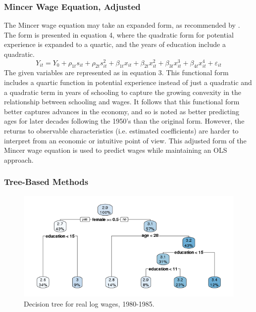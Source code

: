 \documentclass[notitlepage,12pt]{article}
\begin{document}
\subsubsection{Mincer Wage Equation, Adjusted}
The Mincer wage equation may take an expanded form, as recommended by \cite{lemieux2006mincer}.  The form is presented in equation 4, where the quadratic form for potential experience is expanded to a quartic, and the years of education include a quadratic.  
\begin{equation}
Y_{it}  = Y_0 + \rho_{1t} s_{it} + \rho_{2t} s_{it}^2 + \beta_{1t} x_{it} + \beta_{2t} x_{it}^2 + \beta_{3t} x_{it}^3 + \beta_{4t} x_{it}^4 + \varepsilon_{it}
\end{equation}
The given variables are represented as in equation 3.  This functional form   
includes a quartic function in potential experience instead of just a quadratic and a quadratic term in years of schooling to capture the growing convexity in the relationship between schooling and wages.  It follows that this functional form better captures advances in the economy, and so is noted as better predicting ages for later decades following the 1950's than the original form.  However, the returns to observable characteristics (i.e. estimated coefficients) are harder to interpret from an economic or intuitive point of view.  This adjusted form of the Mincer wage equation is used to predict wages while maintaining an OLS approach.

\subsubsection{Tree-Based Methods}
\begin{figure}[H]
  \centering
  \caption{Decision tree for real log wages, 1980-1985.}
  \includegraphics[width=\textwidth]{Rpat1980_1985.png}
\end{figure}
\end{document}
